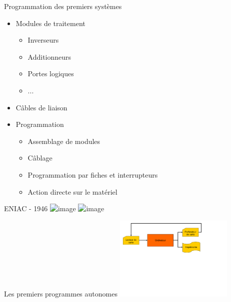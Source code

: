 \begin{frame}{Programmation des premiers systèmes}
\begin{itemize}
\item Modules de traitement
\begin{itemize}
\item Inverseurs
\item Additionneurs
\item Portes logiques
\item ...
\end{itemize}
\item Câbles de liaison
\item Programmation
\begin{itemize}
\item Assemblage de modules
\item Câblage
\item Programmation par fiches et interrupteurs
\item Action directe sur le matériel
\end{itemize}
\end{itemize}
\end{frame}

\begin{frame}{ENIAC - 1946}
\includegraphics<1>[height=4.5cm]{../illustration/eniac1.png}
\includegraphics<2>[height=4.5cm]{../illustration/eniac2.png}
\end{frame}


\begin{frame}{Les premiers programmes autonomes}
\includegraphics[height=4cm]{../illustration/pgm_autonome.pdf}
\end{frame}


